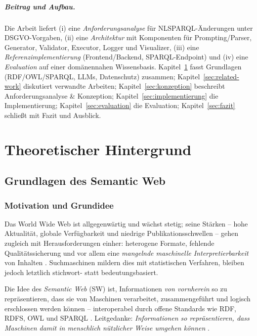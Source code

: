 \paragraph{Beitrag und Aufbau.}
Die Arbeit liefert (i) eine \emph{Anforderungsanalyse} für NL{\textrightarrow}SPARQL-Änderungen unter DSGVO-Vorgaben, (ii) eine \emph{Architektur} mit Komponenten für Prompting/Parser, Generator, Validator, Executor, Logger und Visualizer, (iii) eine \emph{Referenzimplementierung} (Frontend/Backend, SPARQL-Endpoint) und (iv) eine \emph{Evaluation} auf einer domänennahen Wissensbasis. Kapitel~\ref{sec:theorie} fasst Grundlagen (RDF/OWL/SPARQL, LLMs, Datenschutz) zusammen; Kapitel~\ref{sec:related-work} diskutiert verwandte Arbeiten; Kapitel~\ref{sec:konzeption} beschreibt Anforderungsanalyse \& Konzeption; Kapitel~\ref{sec:implementierung} die Implementierung; Kapitel~\ref{sec:evaluation} die Evaluation; Kapitel~\ref{sec:fazit} schließt mit Fazit und Ausblick.





\chapter{Theoretischer Hintergrund}
\label{sec:theorie}

\section{Grundlagen des Semantic Web}
\label{sec:grundlagen-semantic-web}

\subsection{Motivation und Grundidee}

Das World Wide Web ist allgegenwärtig und wächst stetig; seine Stärken -- hohe Aktualität, globale Verfügbarkeit und niedrige Publikationsschwellen -- gehen zugleich mit Herausforderungen einher: heterogene Formate, fehlende Qualitätssicherung und vor allem eine \emph{mangelnde maschinelle Interpretierbarkeit} von Inhalten \cite{Hitzler}. Suchmaschinen mildern dies mit statistischen Verfahren, bleiben jedoch letztlich stichwort- statt bedeutungsbasiert. 

Die Idee des \emph{Semantic Web} (SW) ist, Informationen \emph{von vornherein} so zu repräsentieren, dass sie von Maschinen verarbeitet, zusammengeführt und logisch erschlossen werden können -- interoperabel durch offene Standards wie RDF, RDFS, OWL und SPARQL \cite{Hitzler,AntoniouVanHarmelen}. Leitgedanke: \emph{Informationen so repräsentieren, dass Maschinen damit in menschlich nützlicher Weise umgehen können} \cite{Hitzler}.

